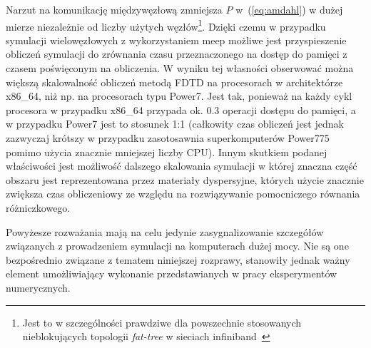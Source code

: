 Narzut na komunikację międzywęzłową zmniejsza $P$ w~(\ref{eq:amdahl}) w dużej mierze niezależnie od liczby użytych węzłów\footnote{Jest to w szczególności prawdziwe dla powszechnie stosowanych nieblokujących topologii \textit{fat-tree} w sieciach infiniband~\cite{zahavi2010optimized}}. Dzięki czemu w przypadku symulacji wielowęzłowych z wykorzystaniem meep możliwe jest przyspieszenie obliczeń symulacji do zrównania czasu przeznaczonego na dostęp do pamięci z czasem poświęconym na obliczenia. W wyniku tej własności obserwować można większą skalowalność obliczeń metodą FDTD na procesorach w architektórze x86\_64, niż np. na procesorach typu Power7. Jest tak, ponieważ na każdy cykl procesora w przypadku x86\_64 przypada ok. 0.3 operacji dostępu do pamięci, a w przypadku Power7 jest to stosunek 1:1 (całkowity czas obliczeń jest jednak zazwyczaj krótszy w przypadku zasotosawnia superkomputerów Power775 pomimo użycia znacznie mniejszej liczby CPU). Innym skutkiem podanej właściwości jest możliwość dalszego skalowania symulacji w której znaczna część obszaru jest reprezentowana przez materiały dyspersyjne, których użycie znacznie zwiększa czas obliczeniowy ze względu na rozwiązywanie pomocniczego równania różniczkowego.

Powyżesze rozważania mają na celu jedynie zasygnalizowanie szczegółów związanych z prowadzeniem symulacji na komputerach dużej mocy. Nie są one bezpośrednio związane z tematem niniejszej rozprawy, stanowiły jednak ważny element umożliwiający wykonanie przedstawianych w pracy eksperymentów numerycznych.
